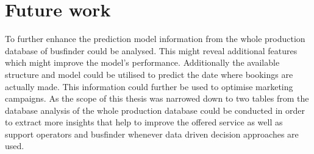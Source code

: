 %
%
% 
% 
% 

\chapter{Future work}
\label{chap:future_work}
To further enhance the prediction model information from the whole production database of busfinder could be analysed. This might reveal additional features which might improve the model's performance. Additionally the available structure and model could be utilised to predict the date where bookings are actually made. This information could further be used to optimise marketing campaigns. As the scope of this thesis was narrowed down to two tables from the database analysis of the whole production database could be conducted in order to extract more insights that help to improve the offered service as well as support operators and busfinder whenever data driven decision approaches are used. 
